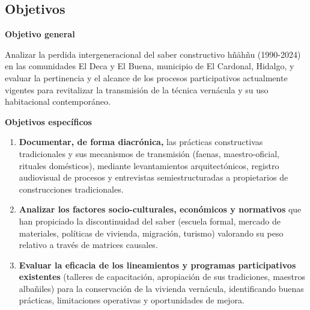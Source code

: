 \subsection{Objetivos}

\textbf{Objetivo general}

Analizar la perdida intergeneracional del saber constructivo hñähñu (1990-2024) en las comunidades El Deca y El Buena, municipio de El Cardonal, Hidalgo, y evaluar la pertinencia y el alcance de los procesos participativos actualmente vigentes para revitalizar la transmisión de la técnica vernácula y su uso habitacional contemporáneo.

\vspace{1em}
\textbf{Objetivos específicos}

\begin{enumerate}
	\item \textbf{Documentar, de forma diacrónica,} las prácticas constructivas tradicionales y sus mecanismos de transmisión (faenas, maestro-oficial, rituales domésticos), mediante levantamientos arquitectónicos, registro audiovisual de procesos y entrevistas semiestructuradas a propietarios de construcciones tradicionales.

	\item \textbf{Analizar los factores socio-culturales, económicos y normativos} que han propiciado la discontinuidad del saber (escuela formal, mercado de materiales, políticas de vivienda, migración, turismo) valorando su peso relativo a través de matrices causales.

	\item \textbf{Evaluar la eficacia de los lineamientos y programas participativos existentes} (talleres de capacitación, apropiación de sus tradiciones, maestros albañiles) para la conservación de la vivienda vernácula, identificando buenas prácticas, limitaciones operativas y oportunidades de mejora.
\end{enumerate}
